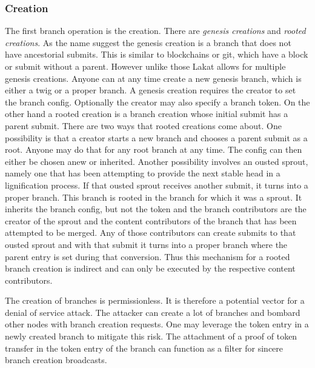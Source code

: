 \subsubsection*{Creation} 
The first branch operation is the creation. There are \textit{genesis creations} and \textit{rooted creations}. As the name suggest the genesis creation is a branch that does not have ancestorial submits. This is similar to blockchains or git, which have a block or submit without a parent. However unlike those Lakat allows for multiple genesis creations. Anyone can at any time create a new genesis branch, which is either a twig or a proper branch. A genesis creation requires the creator to set the branch config. Optionally the creator may also specify a branch token. 
On the other hand a rooted creation is a branch creation whose initial submit has a parent submit. There are two ways that rooted creations come about. One possibility is that a creator starts a new branch and chooses a parent submit as a root. Anyone may do that for any root branch at any time. The config can then either be chosen anew or inherited. Another possibility involves an ousted sprout, namely one that has been attempting to provide the next stable head in a lignification process. If that ousted sprout receives another submit, it turns into a proper branch. This branch is rooted in the branch for which it was a sprout. It inherits the branch config, but not the token and the branch contributors are the creator of the sprout and the content contributors of the branch that has been attempted to be merged. Any of those contributors can create submits to that ousted sprout and with that submit it turns into a proper branch where the parent entry is set during that conversion. Thus this mechanism for a rooted branch creation is indirect and can only be executed by the respective content contributors.

The creation of branches is permissionless. It is therefore a potential vector for a denial of service attack. The attacker can create a lot of branches and bombard other nodes with branch creation requests. One may leverage the token entry in a newly created branch to mitigate this risk. The attachment of a proof of token transfer in the token entry of the branch can function as a filter for sincere branch creation broadcasts.  

